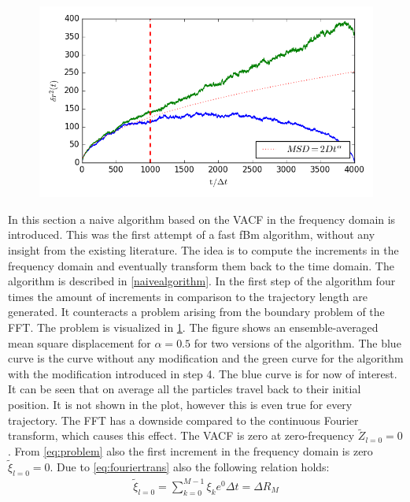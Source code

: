 \documentclass[
  a4paper,BCOR10mm,oneside,
  headsepline,footsepline,%
  fleqn,openbib
]{scrbook}
\begin{document}
\begin{figure}[h]
  \centering
  \includegraphics[width=\textwidth]{./data/boundary_problem.png}
  \captionsetup{width=\linewidth}
  \label{fig:41}
\end{figure}
In this section a naive algorithm based on the VACF in the frequency domain is introduced. This was the first attempt of a fast fBm algorithm, without any insight from the existing literature. The idea is to compute the increments in the frequency domain and eventually transform them back to the time domain. The algorithm is described in \cref{naivealgorithm}. In the first step of the algorithm four times the amount of increments in comparison to the trajectory length are generated. It counteracts a problem arising from the boundary problem of the FFT. The problem is visualized in \cref{fig:41}. The figure shows an ensemble-averaged mean square displacement for $\alpha=0.5$ for two versions of the algorithm. The blue curve is the curve without any modification and the green curve  for the algorithm with the modification introduced in step 4. The blue curve is for now of interest. It can be seen that on average all the particles travel back to their initial position. It is not shown in the plot, however this is even true for every trajectory. The FFT has a downside compared to the continuous Fourier transform, which causes this effect. The VACF is zero at zero-frequency $ \tilde{Z}_{l=0}=0$.  From \cref{eq:problem} also the first increment in the frequency domain is zero $ \tilde{\xi}_{l=0}=0$. Due to \cref{eq:fouriertrans} also the following relation holds:
 \begin{align}
   \tilde{\xi}_{l=0} = \sum_{k=0}^{M-1} \xi_k e^{0} \Delta t = \Delta  R_{M} \label{correction}
 \end{align}
\end{document}
